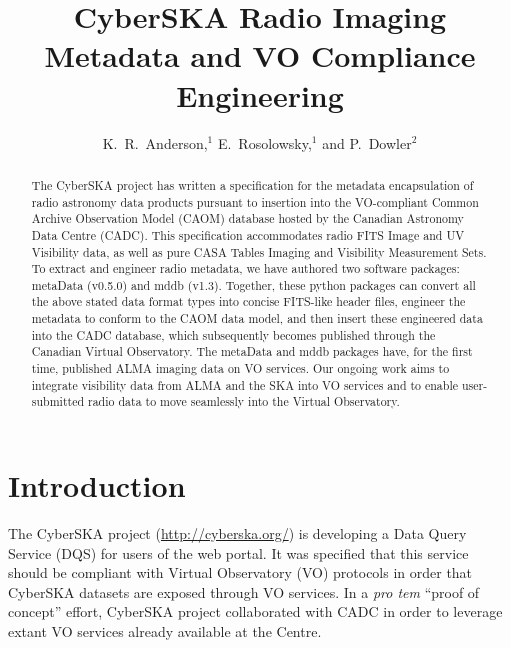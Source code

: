
\resetcounters





\title{CyberSKA Radio Imaging Metadata and VO Compliance Engineering}
\author{K.~R.~Anderson,$^1$ E.~Rosolowsky,$^1$ and P.~Dowler$^2$
}


\begin{abstract}
The CyberSKA project has written a specification for the metadata
encapsulation of radio astronomy data products pursuant to insertion
into the VO-compliant Common Archive Observation Model (CAOM) database
hosted by the Canadian Astronomy Data Centre (CADC). This
specification accommodates radio FITS Image and UV Visibility data, as
well as pure CASA Tables Imaging and Visibility Measurement Sets. To
extract and engineer radio metadata, we have authored two software
packages: metaData (v0.5.0) and mddb (v1.3). Together, these python
packages can convert all the above stated data format types into
concise FITS-like header files, engineer the metadata to conform to
the CAOM data model, and then insert these engineered data into the
CADC database, which subsequently becomes published through the
Canadian Virtual Observatory. The metaData and mddb packages have, for
the first time, published ALMA imaging data on VO services. Our
ongoing work aims to integrate visibility data from ALMA and the SKA
into VO services and to enable user-submitted radio data to move
seamlessly into the Virtual Observatory. 
\end{abstract}

\section{Introduction}
The CyberSKA project  (\url{http://cyberska.org/}) is
developing a Data Query Service (DQS) for users of the web portal. It
was specified that this service should be compliant with Virtual
Observatory (VO) protocols in order that CyberSKA datasets are exposed
through VO services. In a \textit{pro tem} ``proof of concept'' effort,
CyberSKA project collaborated with CADC in order to leverage extant VO
services already available at the Centre.

